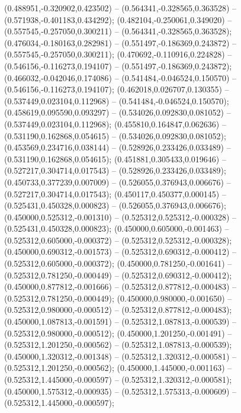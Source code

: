  (0.488951,-0.320902,0.423502) -- (0.564341,-0.328565,0.363528) -- (0.571938,-0.401183,0.434292);
 (0.482104,-0.250061,0.349020) -- (0.557545,-0.257050,0.300211) -- (0.564341,-0.328565,0.363528);
 (0.476034,-0.180163,0.282981) -- (0.551497,-0.186369,0.243872) -- (0.557545,-0.257050,0.300211);
 (0.470692,-0.110916,0.224828) -- (0.546156,-0.116273,0.194107) -- (0.551497,-0.186369,0.243872);
 (0.466032,-0.042046,0.174086) -- (0.541484,-0.046524,0.150570) -- (0.546156,-0.116273,0.194107);
 (0.462018,0.026707,0.130355) -- (0.537449,0.023104,0.112968) -- (0.541484,-0.046524,0.150570);
 (0.458619,0.095590,0.093297) -- (0.534026,0.092830,0.081052) -- (0.537449,0.023104,0.112968);
 (0.455810,0.164847,0.062636) -- (0.531190,0.162868,0.054615) -- (0.534026,0.092830,0.081052);
 (0.453569,0.234716,0.038144) -- (0.528926,0.233426,0.033489) -- (0.531190,0.162868,0.054615);
 (0.451881,0.305433,0.019646) -- (0.527217,0.304714,0.017543) -- (0.528926,0.233426,0.033489);
 (0.450733,0.377239,0.007009) -- (0.526055,0.376943,0.006676) -- (0.527217,0.304714,0.017543);
 (0.450117,0.450377,0.000145) -- (0.525431,0.450328,0.000823) -- (0.526055,0.376943,0.006676);
 (0.450000,0.525312,-0.001310) -- (0.525312,0.525312,-0.000328) -- (0.525431,0.450328,0.000823);
 (0.450000,0.605000,-0.001463) -- (0.525312,0.605000,-0.000372) -- (0.525312,0.525312,-0.000328);
 (0.450000,0.690312,-0.001573) -- (0.525312,0.690312,-0.000412) -- (0.525312,0.605000,-0.000372);
 (0.450000,0.781250,-0.001641) -- (0.525312,0.781250,-0.000449) -- (0.525312,0.690312,-0.000412);
 (0.450000,0.877812,-0.001666) -- (0.525312,0.877812,-0.000483) -- (0.525312,0.781250,-0.000449);
 (0.450000,0.980000,-0.001650) -- (0.525312,0.980000,-0.000512) -- (0.525312,0.877812,-0.000483);
 (0.450000,1.087813,-0.001591) -- (0.525312,1.087813,-0.000539) -- (0.525312,0.980000,-0.000512);
 (0.450000,1.201250,-0.001491) -- (0.525312,1.201250,-0.000562) -- (0.525312,1.087813,-0.000539);
 (0.450000,1.320312,-0.001348) -- (0.525312,1.320312,-0.000581) -- (0.525312,1.201250,-0.000562);
 (0.450000,1.445000,-0.001163) -- (0.525312,1.445000,-0.000597) -- (0.525312,1.320312,-0.000581);
 (0.450000,1.575312,-0.000935) -- (0.525312,1.575313,-0.000609) -- (0.525312,1.445000,-0.000597);
